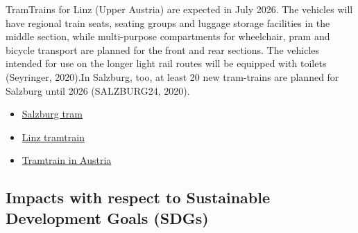 \documentclass[
]{book}
\providecommand{\tightlist}{%
  \setlength{\itemsep}{0pt}\setlength{\parskip}{0pt}}
\begin{document}
TramTrains for Linz (Upper Austria) are expected in July 2026. The vehicles will have regional train seats, seating groups and luggage storage facilities in the middle section, while multi-purpose compartments for wheelchair, pram and bicycle transport are planned for the front and rear sections. The vehicles intended for use on the longer light rail routes will be equipped with toilets (Seyringer, 2020).In Salzburg, too, at least 20 new tram-trains are planned for Salzburg until 2026 (SALZBURG24, 2020).

\begin{itemize}
\tightlist
\item
  \href{https://www.salzburg24.at/news/salzburg/salzburger-lokalbahn-bekommt-neue-tram-trains-91192069}{Salzburg tram}
\item
  \href{https://www.ots.at/presseaussendung/OTS_20210312_OTS0128/grueneweratschnig-vom-muehlkreis-aus-bald-per-tram-train-nach-linz-statt-im-stau-auf-der-a7}{Linz tramtrain}
\item
  \href{https://kommunal.at/eisenbahn-und-stadtbahn-einem}{Tramtrain in Austria}
\end{itemize}

\hypertarget{impacts-with-respect-to-sustainable-development-goals-sdgs-38}{%
\subsection*{Impacts with respect to Sustainable Development Goals (SDGs)}\label{impacts-with-respect-to-sustainable-development-goals-sdgs-38}}
\end{document}
